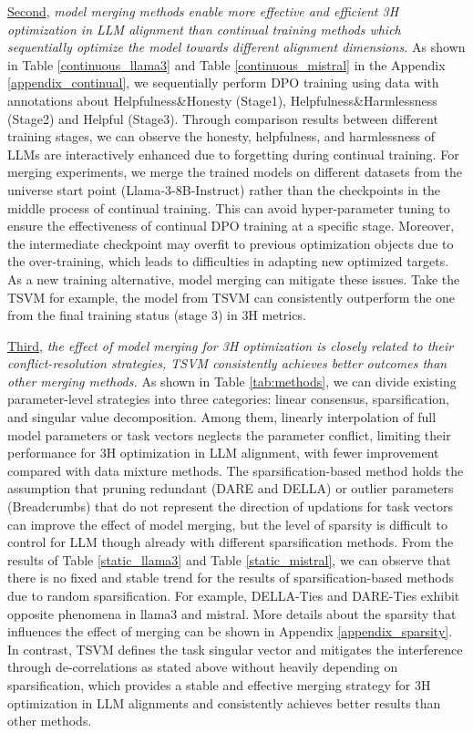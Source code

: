 \underline{Second}, \textit{model merging methods enable more effective and efficient 3H optimization in LLM alignment than continual training methods which sequentially optimize the model towards different alignment dimensions.} As shown in Table \ref{continuous_llama3} and Table \ref{continuous_mistral} in the Appendix \ref{appendix_continual}, we sequentially perform DPO training using data with annotations about Helpfulness\&Honesty (Stage1), Helpfulness\&Harmlessness (Stage2) and Helpful (Stage3). Through comparison results between different training stages, we can observe the honesty, helpfulness, and harmlessness of LLMs are interactively enhanced due to forgetting during continual training. For merging experiments, we merge the trained models on different datasets from the universe start point (Llama-3-8B-Instruct) rather than the checkpoints in the middle process of continual training. This can avoid hyper-parameter tuning to ensure the effectiveness of continual DPO training at a specific stage. Moreover, the intermediate checkpoint may overfit to previous optimization objects due to the over-training, which leads to difficulties in adapting new optimized targets. As a new training alternative, model merging can mitigate these issues. Take the TSVM for example, the model from TSVM can consistently outperform the one from the final training status (stage 3) in 3H metrics.



\underline{Third}, \textit{the effect of model merging for 3H optimization is closely related to their conflict-resolution strategies, TSVM consistently achieves better outcomes than other merging methods.} As shown in Table \ref{tab:methods}, we can divide existing parameter-level strategies into three categories: linear consensus, sparsification, and singular value decomposition. Among them, linearly interpolation of full model parameters or task vectors neglects the parameter conflict, limiting their performance for 3H optimization in LLM alignment, with fewer improvement compared with data mixture methods. The sparsification-based method holds the assumption that pruning redundant (DARE and DELLA) or outlier parameters (Breadcrumbs) that do not represent the direction of updations for task vectors can improve the effect of model merging, but the level of sparsity is difficult to control for LLM though already with different sparsification methods. From the results of Table \ref{static_llama3} and Table \ref{static_mistral}, we can observe that there is no fixed and stable trend
for the results of sparsification-based methods due to random sparsification.
For example, DELLA-Ties and DARE-Ties exhibit opposite phenomena in llama3 and mistral. More details about the sparsity that influences the effect of merging can be shown in Appendix \ref{appendix_sparsity}. In contrast, TSVM defines the task singular vector and mitigates the interference through de-correlations as stated above without heavily depending on sparsification, which provides a stable and effective merging strategy for 3H optimization in LLM alignments and consistently achieves better results than other methods.


